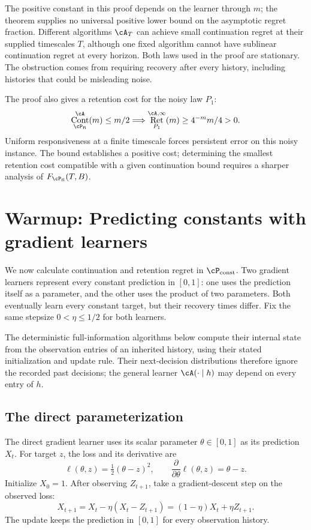 \documentclass[11pt,twoside]{article}
\theoremstyle{definition}
\theoremstyle{remark}
\DeclareMathOperator{\Cont}{Cont}
\DeclareMathOperator{\Ret}{Ret}
\begin{document}
The positive constant in this proof depends on the learner through $m$;
the theorem supplies no universal positive lower bound on the asymptotic
regret fraction. Different algorithms $\cA_T$ can achieve small
continuation regret at their supplied
timescales $T$, although one fixed algorithm cannot have sublinear
continuation regret at every horizon. Both laws used in the proof are
stationary. The obstruction comes from requiring recovery after every
history, including histories that could be misleading noise.

The proof also gives a retention cost for the noisy law $P_1$:
\begin{equation}
 \Cont_{\cP_{\rm fi}}^{\cA}(m)\le m/2
 \quad\Longrightarrow\quad
 \Ret_{P_1}^{\cA,\infty}(m)\ge 4^{-m}m/4>0.
 \label{eq:noisy-retention-cost}
\end{equation}
Uniform responsiveness at a finite timescale forces persistent error on
this noisy instance. The bound establishes a positive cost; determining
the smallest retention cost compatible with a given continuation bound
requires a sharper analysis of $F_{\cP_{\rm fi}}(T,B)$.

\section{Warmup: Predicting constants with gradient learners}
\label{sec:factorization}

We now calculate continuation and retention regret in $\cP_{\rm const}$.
Two gradient learners represent every constant prediction in $[0,1]$:
one uses the prediction itself as a parameter, and the other uses the
product of two parameters. Both eventually learn every constant target,
but their recovery times differ. Fix the same stepsize $0<\eta\le1/2$
for both learners.

The deterministic full-information algorithms below compute their internal
state from the observation entries of an inherited history, using their
stated initialization and update rule. Their next-decision distributions
therefore ignore the recorded past decisions; the general learner
$\cA(\cdot\mid h)$ may depend on every entry of $h$.

\subsection{The direct parameterization}

The direct gradient learner uses its scalar parameter $\theta\in[0,1]$
as its prediction $X_t$. For target $z$, the loss and its
derivative are
\[
 \ell(\theta,z)=\tfrac12(\theta-z)^2,
 \qquad
 \frac{\partial}{\partial\theta}\ell(\theta,z)=\theta-z.
\]
Initialize $X_0=1$. After observing $Z_{t+1}$, take a
gradient-descent step on the observed loss:
\begin{equation}
 X_{t+1}
 =X_t-\eta(X_t-Z_{t+1})
 =(1-\eta)X_t+\eta Z_{t+1}.
 \label{eq:direct}
\end{equation}
The update keeps the prediction in $[0,1]$ for every observation history.
\end{document}
